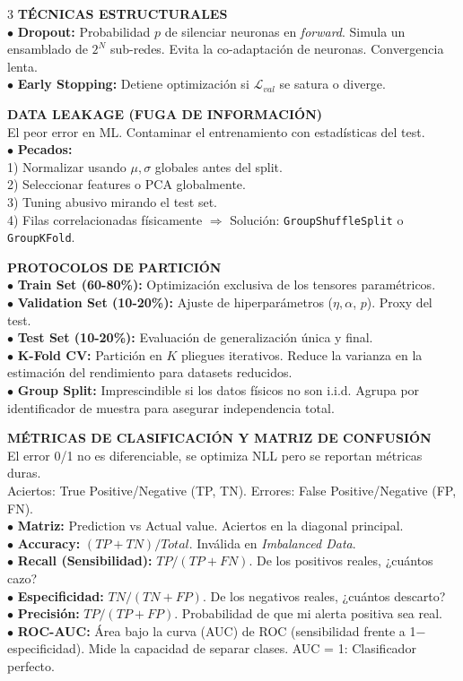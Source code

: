 \documentclass[8pt,a4paper,landscape,fleqn]{extarticle}
\begin{document}
\begin{multicols*}{3}
\textbf{TÉCNICAS ESTRUCTURALES}\\
$\bullet$ \textbf{Dropout:} Probabilidad $p$ de silenciar neuronas en \textit{forward}. Simula un ensamblado de $2^N$ sub-redes. Evita la co-adaptación de neuronas. Convergencia lenta.\\
$\bullet$ \textbf{Early Stopping:} Detiene optimización si $\mathcal{L}_{val}$ se satura o diverge.

\textbf{DATA LEAKAGE (FUGA DE INFORMACIÓN)}\\
El peor error en ML. Contaminar el entrenamiento con estadísticas del test.\\
$\bullet$ \textbf{Pecados:} \\1) Normalizar usando $\mu, \sigma$ globales antes del split. \\2) Seleccionar features o PCA globalmente. \\3) Tuning abusivo mirando el test set. \\4) Filas correlacionadas físicamente  $\Rightarrow$ Solución: \texttt{GroupShuffleSplit} o \texttt{GroupKFold}.

\textbf{PROTOCOLOS DE PARTICIÓN}\\
$\bullet$ \textbf{Train Set (60-80\%):} Optimización exclusiva de los tensores paramétricos.\\
$\bullet$ \textbf{Validation Set (10-20\%):} Ajuste de hiperparámetros ($\eta, \alpha$, $p$). Proxy del test.\\
$\bullet$ \textbf{Test Set (10-20\%):} Evaluación de generalización única y final.\\
$\bullet$ \textbf{K-Fold CV:} Partición en $K$ pliegues iterativos. Reduce la varianza en la estimación del rendimiento para datasets reducidos.\\
$\bullet$ \textbf{Group Split:} Imprescindible si los datos físicos no son i.i.d. Agrupa por identificador de muestra para asegurar independencia total.

\textbf{MÉTRICAS DE CLASIFICACIÓN Y MATRIZ DE CONFUSIÓN}\\
El error 0/1 no es diferenciable, se optimiza NLL pero se reportan métricas duras.\\
Aciertos: True Positive/Negative (TP, TN). Errores: False Positive/Negative (FP, FN).\\
$\bullet$ \textbf{Matriz:} Prediction vs Actual value. Aciertos en la diagonal principal.\\
$\bullet$ \textbf{Accuracy:} $(TP+TN)/Total$. Inválida en \textit{Imbalanced Data}.\\
$\bullet$ \textbf{Recall (Sensibilidad):} $TP/(TP+FN)$. De los positivos reales, ¿cuántos cazo?\\
$\bullet$ \textbf{Especificidad:} $TN/(TN+FP)$. De los negativos reales, ¿cuántos descarto?\\
$\bullet$ \textbf{Precisión:} $TP/(TP+FP)$. Probabilidad de que mi alerta positiva sea real.\\
$\bullet$ \textbf{ROC-AUC:} Área bajo la curva (AUC) de ROC (sensibilidad frente a 1$-$especificidad). Mide la capacidad de separar clases. AUC = 1: Clasificador perfecto.


\end{multicols*}
\end{document}
